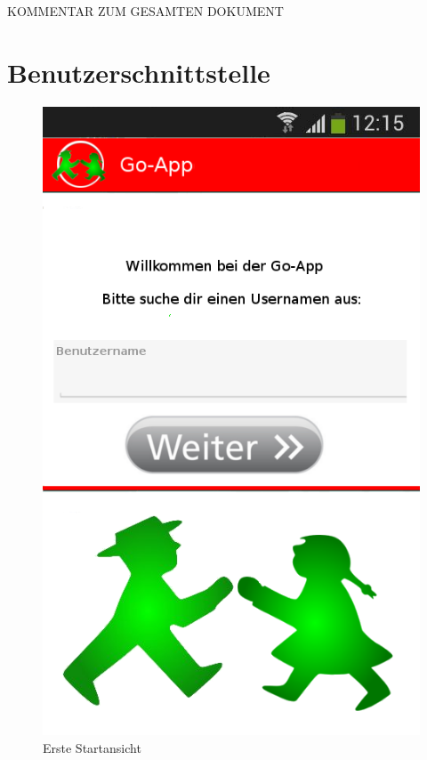 KOMMENTAR ZUM GESAMTEN DOKUMENT


\section{Benutzerschnittstelle}
\begin{figure}
\caption{Erste Startansicht}
\includegraphics[scale = 0.5]{resources/images/startansicht.png}
\end{figure}


